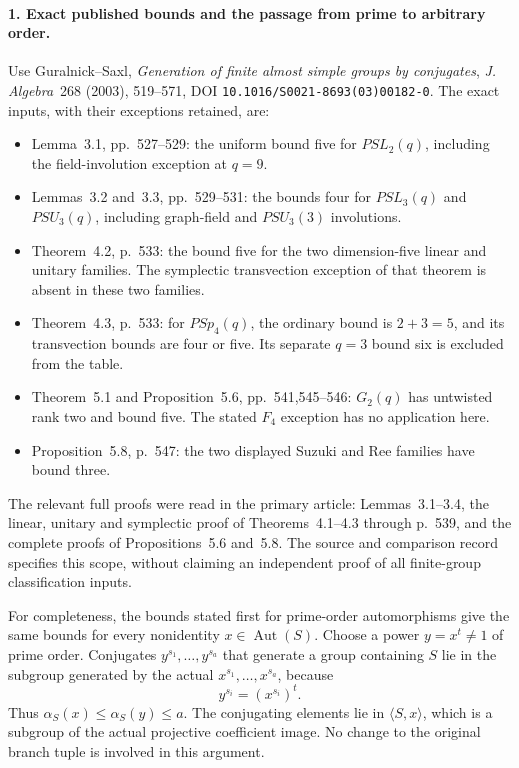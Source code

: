 \paragraph{1. Exact published bounds and the passage from prime to arbitrary order.}
Use Guralnick--Saxl, \emph{Generation of finite almost simple
groups by conjugates}, \emph{J. Algebra}~268 (2003),
519--571, DOI \texttt{10.1016/S0021-8693(03)00182-0}.
The exact inputs, with their exceptions retained, are:
\begin{itemize}
\item Lemma~3.1, pp.~527--529: the uniform bound five for
\(PSL_2(q)\), including the field-involution exception
at \(q=9\).
\item Lemmas~3.2 and~3.3, pp.~529--531: the bounds four
for \(PSL_3(q)\) and \(PSU_3(q)\), including graph-field
and \(PSU_3(3)\) involutions.
\item Theorem~4.2, p.~533: the bound five for the two
dimension-five linear and unitary families. The symplectic
transvection exception of that theorem is absent in these
two families.
\item Theorem~4.3, p.~533: for \(PSp_4(q)\), the ordinary
bound is \(2+3=5\), and its transvection bounds are four
or five. Its separate \(q=3\) bound six is excluded from
the table.
\item Theorem~5.1 and Proposition~5.6, pp.~541,545--546:
\(G_2(q)\) has untwisted rank two and bound five. The
stated \(F_4\) exception has no application here.
\item Proposition~5.8, p.~547: the two displayed Suzuki
and Ree families have bound three.
\end{itemize}
The relevant full proofs were read in the primary article:
Lemmas~3.1--3.4, the linear, unitary and symplectic proof
of Theorems~4.1--4.3 through p.~539, and the complete proofs
of Propositions~5.6 and~5.8. The source and comparison
record specifies this scope, without claiming an independent
proof of all finite-group classification inputs.

For completeness, the bounds stated first for prime-order
automorphisms give the same bounds for every nonidentity
\(x\in\operatorname{Aut}(S)\). Choose a power
\(y=x^t\ne1\) of prime order. Conjugates
\(y^{s_1},\ldots,y^{s_a}\) that generate a group containing
\(S\) lie in the subgroup generated by the actual
\(x^{s_1},\ldots,x^{s_a}\), because
\[
 y^{s_i}=(x^{s_i})^t.
 \tag{F1T14.2}
\]
Thus \(\alpha_S(x)\le\alpha_S(y)\le a\). The conjugating
elements lie in \(\langle S,x\rangle\), which is a subgroup
of the actual projective coefficient image. No change to
the original branch tuple is involved in this argument.


